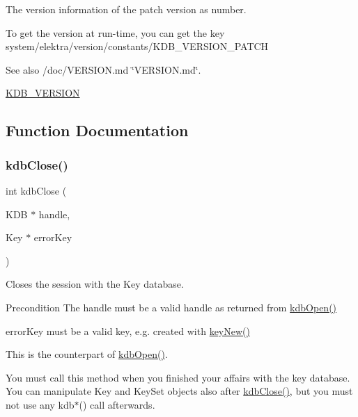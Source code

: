 The version information of the patch version as number. 

To get the version at run-\/time, you can get the key system/elektra/version/constants/\+K\+D\+B\+\_\+\+V\+E\+R\+S\+I\+O\+N\+\_\+\+P\+A\+T\+CH

\begin{DoxySeeAlso}{See also}
/doc/\+V\+E\+R\+S\+I\+ON.md \char`\"{}\+V\+E\+R\+S\+I\+O\+N.\+md\char`\"{}. 

\hyperlink{group__kdb_ga2f8953fe5f9f28db54b3ef678ebf40d7}{K\+D\+B\+\_\+\+V\+E\+R\+S\+I\+ON} 
\end{DoxySeeAlso}


\subsection{Function Documentation}
\mbox{\label{group__kdb_gadb54dc9fda17ee07deb9444df745c96f}} 
\subsubsection{\texorpdfstring{kdb\+Close()}{kdbClose()}}
{\footnotesize\ttfamily int kdb\+Close (\begin{DoxyParamCaption}\item[{K\+DB $\ast$}]{handle,  }\item[{Key $\ast$}]{error\+Key }\end{DoxyParamCaption})}



Closes the session with the Key database. 

\begin{DoxyPrecond}{Precondition}
The handle must be a valid handle as returned from \hyperlink{group__kdb_ga6808defe5870f328dd17910aacbdc6ca}{kdb\+Open()}

error\+Key must be a valid key, e.\+g. created with \hyperlink{group__key_gad23c65b44bf48d773759e1f9a4d43b89}{key\+New()}
\end{DoxyPrecond}
This is the counterpart of \hyperlink{group__kdb_ga6808defe5870f328dd17910aacbdc6ca}{kdb\+Open()}.

You must call this method when you finished your affairs with the key database. You can manipulate Key and Key\+Set objects also after \hyperlink{group__kdb_gadb54dc9fda17ee07deb9444df745c96f}{kdb\+Close()}, but you must not use any kdb$\ast$() call afterwards.

